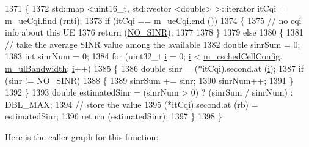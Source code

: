 \begin{DoxyCode}
1371 \{
1372   std::map <uint16\_t, std::vector <double> >::iterator itCqi = \hyperlink{classns3_1_1FdMtFfMacScheduler_a5111c284868ab2a71c868fff681dbc0b}{m\_ueCqi}.find (rnti);
1373   \textcolor{keywordflow}{if} (itCqi == \hyperlink{classns3_1_1FdMtFfMacScheduler_a5111c284868ab2a71c868fff681dbc0b}{m\_ueCqi}.end ())
1374     \{
1375       \textcolor{comment}{// no cqi info about this UE}
1376       \textcolor{keywordflow}{return} (\hyperlink{cqa-ff-mac-scheduler_8h_a520d71777be043568160c783a9c65fd5}{NO\_SINR});
1377 
1378     \}
1379   \textcolor{keywordflow}{else}
1380     \{
1381       \textcolor{comment}{// take the average SINR value among the available}
1382       \textcolor{keywordtype}{double} sinrSum = 0;
1383       \textcolor{keywordtype}{int} sinrNum = 0;
1384       \textcolor{keywordflow}{for} (uint32\_t \hyperlink{bernuolliDistribution_8m_a6f6ccfcf58b31cb6412107d9d5281426}{i} = 0; \hyperlink{bernuolliDistribution_8m_a6f6ccfcf58b31cb6412107d9d5281426}{i} < \hyperlink{classns3_1_1FdMtFfMacScheduler_a9f2e3c6bfae8bfc266a84f64e5937ac8}{m\_cschedCellConfig}.
      \hyperlink{structns3_1_1FfMacCschedSapProvider_1_1CschedCellConfigReqParameters_a5ab5b102878e6e7e7727a14af4a64d2f}{m\_ulBandwidth}; \hyperlink{bernuolliDistribution_8m_a6f6ccfcf58b31cb6412107d9d5281426}{i}++)
1385         \{
1386           \textcolor{keywordtype}{double} sinr = (*itCqi).second.at (\hyperlink{bernuolliDistribution_8m_a6f6ccfcf58b31cb6412107d9d5281426}{i});
1387           \textcolor{keywordflow}{if} (sinr != \hyperlink{cqa-ff-mac-scheduler_8h_a520d71777be043568160c783a9c65fd5}{NO\_SINR})
1388             \{
1389               sinrSum += sinr;
1390               sinrNum++;
1391             \}
1392         \}
1393       \textcolor{keywordtype}{double} estimatedSinr = (sinrNum > 0) ? (sinrSum / sinrNum) : DBL\_MAX;
1394       \textcolor{comment}{// store the value}
1395       (*itCqi).second.at (rb) = estimatedSinr;
1396       \textcolor{keywordflow}{return} (estimatedSinr);
1397     \}
1398 \}
\end{DoxyCode}


Here is the caller graph for this function\+:


